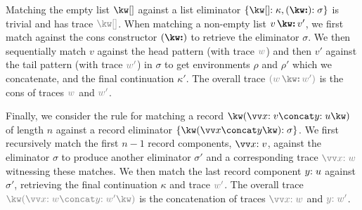Matching the empty list $\exNil$ against a list eliminator $\elimList{\kappa}{\sigma}$ is trivial and has trace $\textcolor{gray}{\exNil}$. When matching a non-empty list $\exCons{v}{v'}$, we first match against the cons constructor $(\symCons)$ to retrieve the eliminator $\sigma$. We then sequentially match $v$ against the head pattern (with trace $\textcolor{gray}{w}$) and then $v'$ against the tail pattern (with trace $\textcolor{gray}{w'}$) in $\sigma$ to get environments $\rho$ and $\rho'$ which we concatenate, and the final continuation $\kappa'$. The overall trace $\textcolor{gray}{(\exCons{w}{w'})}$ is the cons of traces $\textcolor{gray}{w}$ and $\textcolor{gray}{w'}$.

Finally, we consider the rule for matching a record $\exRec{\vec{\bind{x}{v}} \concat \bind{y}{u}}$ of length $n$ against a record eliminator $\elimRec{\vec{x} \concat y}{\sigma}$. We first recursively match the first $n - 1$ record components, $\vec{\bind{x}{v}}$, against the eliminator $\sigma$ to produce another eliminator $\sigma'$ and a corresponding trace $\textcolor{gray}{\vec{\bind{x}{w}}}$ witnessing these matches. We then match the last record component $y{:}\;u$ against $\sigma'$, retrieving the final continuation $\kappa$ and trace $\textcolor{gray}{w'}$. The overall trace $\textcolor{gray}{\exRec{\vec{\bind{x}{w}} \concat \bind{y}{w'}}}$ is the concatenation of traces $\textcolor{gray}{\vec{\bind{x}{w}}}$ and $\textcolor{gray}{\bind{y}{w'}}$.


